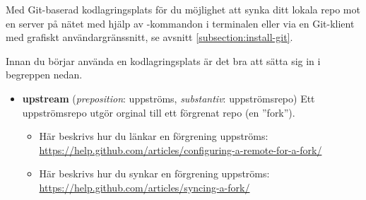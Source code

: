 Med Git-baserad kodlagringsplats för du möjlighet att synka ditt lokala repo mot en server på nätet med hjälp av -kommandon i terminalen eller via en Git-klient med grafiskt användargränssnitt, se avsnitt \ref{subsection:install-git}. 

Innan du börjar använda en kodlagringsplats är det bra att sätta sig in i begreppen nedan.

\begin{itemize}
 Genom att klona ett repo som ligger på en nätlagringsplats kan du bygga, undersöka och vidareutveckla koden lokalt på din dator. Om du har rättigheter att lämna in kod till det centrala orginalet kan du pusha dina commits direkt via terminalkommando eller Git-klient.

 Genom att förgrena ett repo skapar du en kopia, normalt även den nätlagrad på en kodlagringsplats, som du kan utveckla separat från orginalet. Det blir då möjligt för dig att lämna in ändringar och trycka upp dem, även om du inte har rättigheter att leverera (''pusha'') till originalet. Gör en ändringsbegäran (Pull Request, PR) om du vill bidra med dina ändringar, så kan ägaren av orginalet sedan välja att sammanfoga (''merga'') dina ändringar med orginalet. Många nätlagringsplatser, så som GitHub, har en speciell knapp som du trycker på för att enkelt skapa en fork av ett repo under din användare. 

\item \textbf{upstream} (\textit{preposition}: uppströms, \textit{substantiv}: uppströmsrepo) Ett uppströmsrepo utgör orginal till ett förgrenat repo (en ''fork''). 
\begin{itemize}[noitemsep,nolistsep]

\item Här beskrivs hur du länkar en förgrening uppströms: \\ 
{\small\url{https://help.github.com/articles/configuring-a-remote-for-a-fork/}}

\item Här beskrivs hur du synkar en förgrening uppströms:\\
{\small\url{https://help.github.com/articles/syncing-a-fork/}}

\end{itemize}

\end{itemize}

